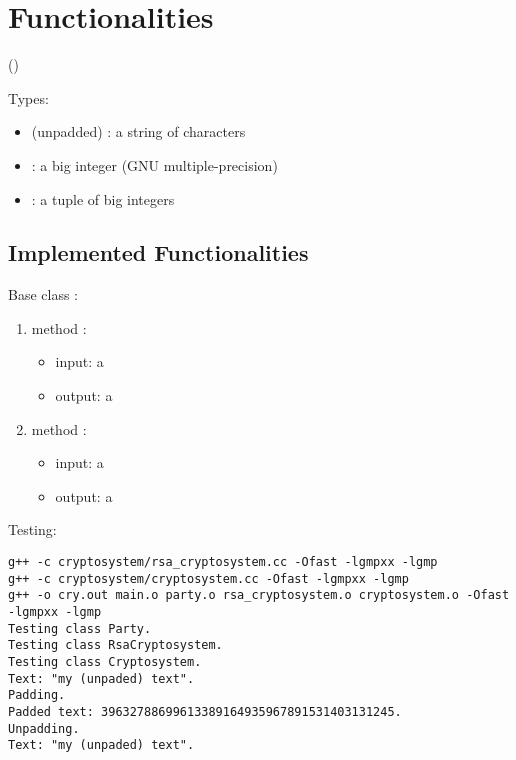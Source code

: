 \section{Functionalities}
(\vp) \bigskip




Types:
\begin{itemize}
\item (unpadded) : a string of characters
\item {}: a big integer (GNU multiple-precision)
\item {}: a tuple of big integers
\end{itemize}

\subsection{Implemented Functionalities}
Base class :
\begin{enumerate}
\item method :
  \begin{itemize}
  \item input: a 
  \item output: a 
  \end{itemize}
\item method :
  \begin{itemize}
  \item input: a 
  \item output: a 
  \end{itemize}
\end{enumerate}


Testing:
\begin{lstlisting}
g++ -c cryptosystem/rsa_cryptosystem.cc -Ofast -lgmpxx -lgmp
g++ -c cryptosystem/cryptosystem.cc -Ofast -lgmpxx -lgmp
g++ -o cry.out main.o party.o rsa_cryptosystem.o cryptosystem.o -Ofast -lgmpxx -lgmp
Testing class Party.
Testing class RsaCryptosystem.
Testing class Cryptosystem.
Text: "my (unpaded) text".
Padding.
Padded text: 39632788699613389164935967891531403131245.
Unpadding.
Text: "my (unpaded) text".
\end{lstlisting}

